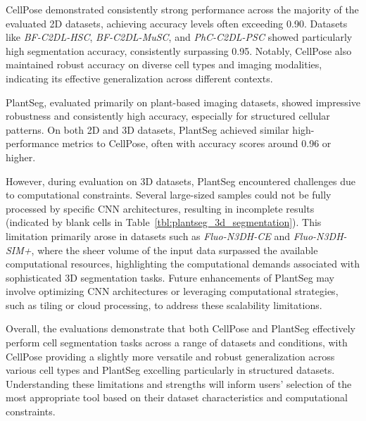 \documentclass[./dissertation.tex]{subfiles}
\begin{document}
CellPose demonstrated consistently strong performance across the majority of the evaluated 2D datasets, achieving accuracy levels often exceeding 0.90. Datasets like \textit{BF-C2DL-HSC}, \textit{BF-C2DL-MuSC}, and \textit{PhC-C2DL-PSC} showed particularly high segmentation accuracy, consistently surpassing 0.95. Notably, CellPose also maintained robust accuracy on diverse cell types and imaging modalities, indicating its effective generalization across different contexts.

PlantSeg, evaluated primarily on plant-based imaging datasets, showed impressive robustness and consistently high accuracy, especially for structured cellular patterns. On both 2D and 3D datasets, PlantSeg achieved similar high-performance metrics to CellPose, often with accuracy scores around 0.96 or higher.

However, during evaluation on 3D datasets, PlantSeg encountered challenges due to computational constraints. Several large-sized samples could not be fully processed by specific CNN architectures, resulting in incomplete results (indicated by blank cells in Table~\ref{tbl:plantseg_3d_segmentation}). This limitation primarily arose in datasets such as \textit{Fluo-N3DH-CE} and \textit{Fluo-N3DH-SIM+}, where the sheer volume of the input data surpassed the available computational resources, highlighting the computational demands associated with sophisticated 3D segmentation tasks. Future enhancements of PlantSeg may involve optimizing CNN architectures or leveraging computational strategies, such as tiling or cloud processing, to address these scalability limitations.

Overall, the evaluations demonstrate that both CellPose and PlantSeg effectively perform cell segmentation tasks across a range of datasets and conditions, with CellPose providing a slightly more versatile and robust generalization across various cell types and PlantSeg excelling particularly in structured datasets. Understanding these limitations and strengths will inform users' selection of the most appropriate tool based on their dataset characteristics and computational constraints.
\end{document}
